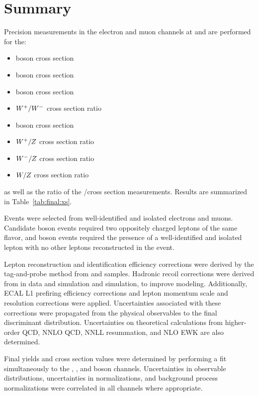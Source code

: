 \chapter{Summary}
Precision measurements in the electron and muon channels at \sg and \sh are performed for the:
\begin{itemize}
    \item \Wp boson cross section
    \item \Wm boson cross section
    \item \W boson cross section
    \item $W^+/W^-$ cross section ratio
    \item \Z boson cross section
    \item $W^+/Z$ cross section ratio
    \item $W^-/Z$ cross section ratio
    \item $W/Z$ cross section ratio
\end{itemize}
as well as the ratio of the \sg/\sh cross section measurements. Results are summarized in Table~\ref{tab:final:xs}.

Events were selected from well-identified and isolated electrons and muons. Candidate \Z boson events required two oppositely charged leptons of the same flavor, and \W boson events required the presence of a well-identified and isolated lepton with no other leptons reconstructed in the event.

Lepton reconstruction and identification efficiency corrections were derived by the tag-and-probe method from \zee and \zmm samples. Hadronic recoil corrections were derived from \zmm in data and simulation and \wmunu simulation, to improve \met modeling. Additionally, ECAL L1 prefiring efficiency corrections and lepton momentum scale and resolution corrections were applied. Uncertainties associated with these corrections were propagated from the physical observables to the final discriminant distribution. Uncertainties on theoretical calculations from higher-order QCD, NNLO QCD, NNLL resummation, and NLO EWK are also determined.

Final yields and cross section values were determined by performing a fit simultaneously to the \Wp, \Wm, and \Z boson channels. Uncertainties in observable distributions, uncertainties in normalizations, and background process normalizations were correlated in all channels where appropriate.
